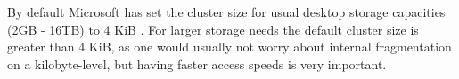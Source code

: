 By default Microsoft has set the cluster size for usual desktop storage capacities (2GB - 16TB) to $4$ KiB \cite{microsoftinc:2018:DCS}. For larger storage needs the default cluster size is greater than $4$ KiB, as one would usually not worry about internal fragmentation on a kilobyte-level, but having faster access speeds is very important.


